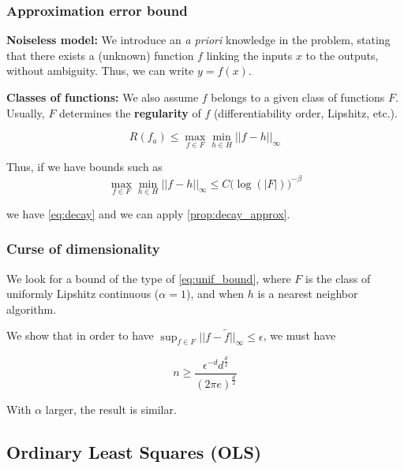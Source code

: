 \documentclass[
10pt, %
a4paper, %
oneside, %
headinclude,footinclude, %
BCOR5mm, %
]{scrartcl}
\begin{document}
    \subsubsection{\large\color{Periwinkle}Approximation error bound}

    \textbf{{Noiseless model:}} We introduce an \textit{{a priori}} knowledge in the problem, stating that there exists a (unknown) function $f$ linking the inputs $x$ to the outputs, without ambiguity. Thus, we can write $y=f(x)$.

    \textbf{{Classes of functions:}} We also assume $f$ belongs to a given class of functions $F$. Usually, $F$ determines the \textbf{{regularity }} of $f$ (differentiability order, Lipshitz, etc.).

    \begin{equation*}
	R(f_a)\leq \max_{f\in F}\min_{h\in H}||f-h||_{\infty}
    \end{equation*}

    Thus, if we have bounds such as
    \begin{equation}
	\label{eq:unif_bound}
\max_{f\in F}\min_{h\in H}||f-h||_{\infty}\leq C\big( \log(|F|) \big)^{-\beta}  
    \end{equation}

    we have \ref{eq:decay} and we can apply \ref{prop:decay_approx}.

    \subsubsection{\large\color{Periwinkle}Curse of dimensionality}

    We look for a bound of the type of \ref{eq:unif_bound}, where $F$ is the class of uniformly Lipshitz continuous ($\alpha=1$), and when  $h$ is a nearest neighbor algorithm.

    We show that in order to have $ \sup_{f\in F}||f- \tilde{f}||_{\infty}\leq \epsilon$, we must have

    \begin{equation*}
	n\geq \frac{\epsilon^{-d}d^{ \frac{d}{2} }}{(2\pi e)^{ \frac{d}{2} } }
    \end{equation*}

    \begin{remark}
        With $\alpha$ larger, the result is similar.
    \end{remark}


\subsection{\large\color{MidnightBlue}Ordinary Least Squares (OLS)}
\label{subsec:ols}
\end{document}
